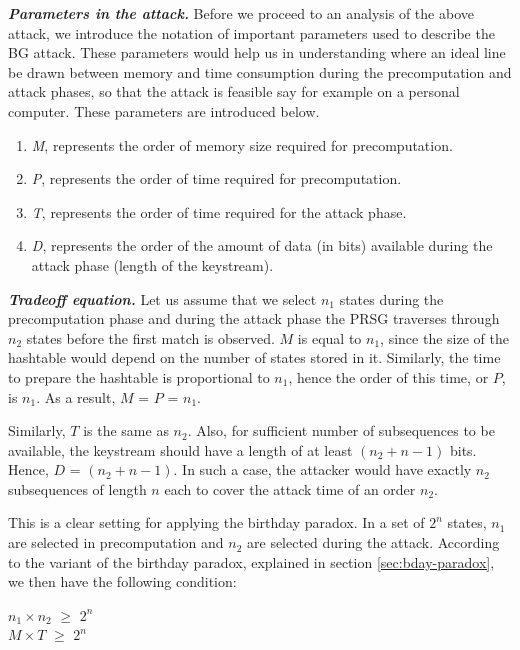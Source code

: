 \textit{\textbf{Parameters in the attack.}} Before we proceed to an analysis of the above attack, we introduce the notation of important parameters used to describe the BG attack. These parameters would help us in understanding where an ideal line be drawn between memory and time consumption during the precomputation and attack phases, so that the attack is feasible say for example on a personal computer. These parameters are introduced below. 

\begin{enumerate}
\item \emph{M}, represents the order of memory size required for precomputation.
\item \emph{P}, represents the order of time required for precomputation.
\item \emph{T}, represents the order of time required for the attack phase.
\item \emph{D}, represents the order of the amount of data (in bits) available during the attack phase (length of the keystream).
\end{enumerate}

\textit{\textbf{Tradeoff equation.}} Let us assume that we select $n_1$ states during the precomputation phase and during the attack phase the PRSG traverses through $n_2$ states before the first match is observed. $M$ is equal to $n_1$, since the size of the hashtable would depend on the number of states stored in it. Similarly, the time to prepare the hashtable is proportional to $n_1$, hence the order of this time, or $P$, is $n_1$. As a result, $M$ = $P$ = $n_1$.

Similarly, $T$ is the same as $n_2$. Also, for sufficient number of subsequences to be available, the keystream should have a length of at least $(n_2 + n - 1)$ bits. Hence, $D$ = $(n_2 + n - 1)$. In such a case, the attacker would have exactly $n_2$ subsequences of length $n$ each to cover the attack time of an order $n_2$.

This is a clear setting for applying the birthday paradox. In a set of $2^n$ states, $n_1$ are selected in precomputation and $n_2$ are selected during the attack. According to the variant of the birthday paradox, explained in section \ref{sec:bday-paradox}, we then have the following condition:

\begin{center}
\large{$n_1 \times n_2$ $\geq$ $2^n$}\\
\large{$M \times T$ $\geq$ $2^n$}\\
\end{center}

